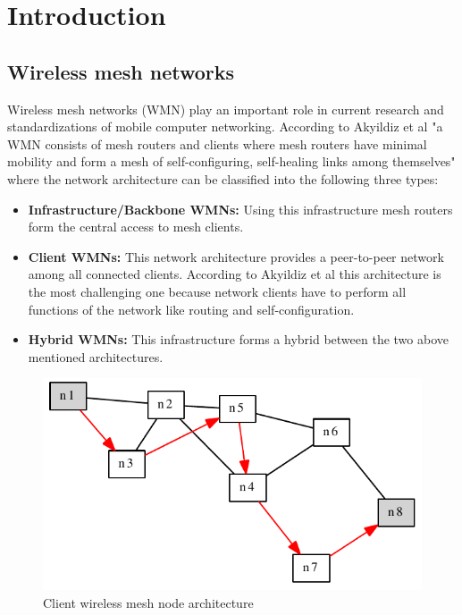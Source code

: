 \chapter{Introduction}%
\section{Wireless mesh networks}%
Wireless mesh networks (WMN) play an important role in current research and standardizations of mobile computer networking. According to Akyildiz et al \cite{wmn-survey} "a WMN consists of mesh routers and clients where mesh routers have minimal mobility and form a mesh of self-configuring, self-healing links among themselves" where the network architecture can be classified into the following three types:

\begin{itemize}
    \item \textbf{Infrastructure/Backbone WMNs:} Using this infrastructure mesh routers form the central access to mesh clients.
    \item \textbf{Client WMNs:} This network architecture provides a peer-to-peer network among all connected clients. According to Akyildiz et al \cite{wmn-survey} this architecture is the most challenging one because network clients have to perform all functions of the network like routing and self-configuration.
    \item \textbf{Hybrid WMNs:} This infrastructure forms a hybrid between the two above mentioned architectures.
\end{itemize}

\begin{figure}[H]
  \begin{center}
    \includegraphics[]{figures/client_wmn}
  \end{center}
  \caption{Client wireless mesh node architecture}
  \label{fig:client_wmn}
\end{figure}

